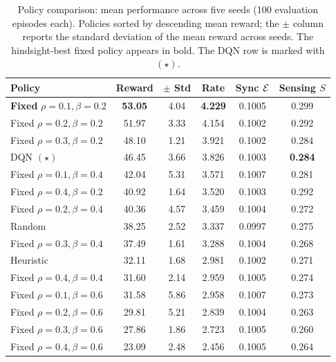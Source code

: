 \begin{table}[!t]
    \centering
    \caption{Policy comparison: mean performance across five seeds (100 evaluation episodes each). Policies sorted by descending mean reward; the $\pm$ column reports the standard deviation of the mean reward across seeds. The hindsight-best fixed policy appears in bold. The DQN row is marked with $(\star)$.}
    \label{tab:baseline}
    \begin{tabular}{lccccc}
        \toprule
        Policy & Reward & $\pm$ Std & Rate & Sync $\mathcal{E}$ & Sensing $S$ \\
        \midrule
        \textbf{Fixed} $\rho{=}0.1, \beta{=}0.2$ & \textbf{53.05} & 4.04 & \textbf{4.229} & 0.1005 & 0.299 \\
        Fixed $\rho{=}0.2, \beta{=}0.2$ & 51.97 & 3.33 & 4.154 & 0.1002 & 0.292 \\
        Fixed $\rho{=}0.3, \beta{=}0.2$ & 48.10 & 1.21 & 3.921 & 0.1002 & 0.284 \\
        DQN $(\star)$ & 46.45 & 3.66 & 3.826 & 0.1003 & \textbf{0.284} \\
        Fixed $\rho{=}0.1, \beta{=}0.4$ & 42.04 & 5.31 & 3.571 & 0.1007 & 0.281 \\
        Fixed $\rho{=}0.4, \beta{=}0.2$ & 40.92 & 1.64 & 3.520 & 0.1003 & 0.292 \\
        Fixed $\rho{=}0.2, \beta{=}0.4$ & 40.36 & 4.57 & 3.459 & 0.1004 & 0.272 \\
        Random & 38.25 & 2.52 & 3.337 & 0.0997 & 0.275 \\
        Fixed $\rho{=}0.3, \beta{=}0.4$ & 37.49 & 1.61 & 3.288 & 0.1004 & 0.268 \\
        Heuristic & 32.11 & 1.68 & 2.981 & 0.1002 & 0.271 \\
        Fixed $\rho{=}0.4, \beta{=}0.4$ & 31.60 & 2.14 & 2.959 & 0.1005 & 0.274 \\
        Fixed $\rho{=}0.1, \beta{=}0.6$ & 31.58 & 5.86 & 2.958 & 0.1007 & 0.273 \\
        Fixed $\rho{=}0.2, \beta{=}0.6$ & 29.81 & 5.21 & 2.839 & 0.1004 & 0.263 \\
        Fixed $\rho{=}0.3, \beta{=}0.6$ & 27.86 & 1.86 & 2.723 & 0.1005 & 0.260 \\
        Fixed $\rho{=}0.4, \beta{=}0.6$ & 23.09 & 2.48 & 2.456 & 0.1005 & 0.264 \\
        \bottomrule
    \end{tabular}
\end{table}

